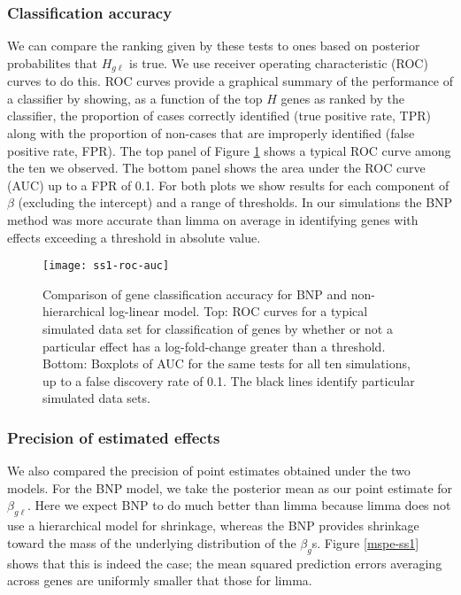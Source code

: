 \subsubsection{Classification accuracy}
We can compare the ranking given by these tests to ones based on posterior probabilites that $H_{g\ell}$ is true. We use receiver operating characteristic (ROC) curves to do this. ROC curves provide a graphical summary of the performance of a classifier by showing, as a function of the top $H$ genes as ranked by the classifier, the proportion of cases correctly identified (true positive rate, TPR) along with the proportion of non-cases that are improperly identified (false positive rate, FPR). The top panel of Figure \ref{roc-ss1} shows a typical ROC curve among the ten we observed. The bottom panel shows the area under the ROC curve (AUC) up to a FPR of 0.1. For both plots we show results for each component of $\beta$ (excluding the intercept) and a range of thresholds. In our simulations the BNP method was more accurate than limma on average in identifying genes with effects exceeding a threshold in absolute value.

% 
\begin{figure}[ht!]
\centering
\texttt{[image: ss1-roc-auc]}
\begin{minipage}{.8\textwidth}
\caption{Comparison of gene classification accuracy for BNP and non-hierarchical log-linear model. \small Top: ROC curves for a typical simulated data set for classification of genes by whether or not a particular effect has a log-fold-change greater than a threshold. Bottom: Boxplots of AUC for the same tests for all ten simulations, up to a false discovery rate of 0.1. The black lines identify particular simulated data sets.}
\label{roc-ss1}
\end{minipage}
\end{figure}

\subsubsection{Precision of estimated effects}
We also compared the precision of point estimates obtained under the two models. For the BNP model, we take the posterior mean as our point estimate for $\beta_{g\ell}$. Here we expect BNP to do much better than limma because limma does not use a hierarchical model for shrinkage, whereas the BNP provides shrinkage toward the mass of the underlying distribution of the $\beta_g$s. Figure \ref{mspe-ss1} shows that this is indeed the case; the mean squared prediction errors averaging across genes are uniformly smaller that those for limma.

